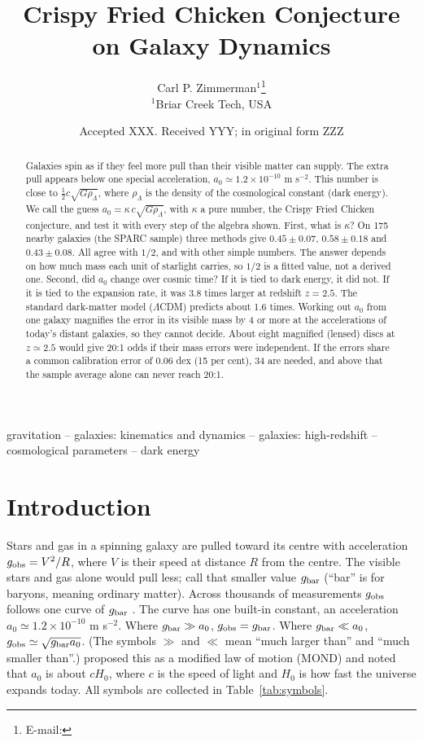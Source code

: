 \documentclass[fleqn,usenatbib]{mnras}
\title[Crispy Fried Chicken Conjecture]{Crispy Fried Chicken Conjecture on Galaxy Dynamics}
\author[C. P. Zimmerman]{Carl P. Zimmerman$^{1}$\thanks{E-mail: \authoremail}
\\
$^{1}$Briar Creek Tech, USA}
\date{Accepted XXX. Received YYY; in original form ZZZ}
\begin{document}
\label{firstpage}
\pagerange{\pageref{firstpage}--\pageref{lastpage}}
\maketitle

\begin{abstract}
Galaxies spin as if they feel more pull than their visible matter can supply. The extra pull appears below one special acceleration, $a_0\simeq1.2\times10^{-10}$ m s$^{-2}$. This number is close to $\tfrac12c\sqrt{G\rho_\Lambda}$, where $\rho_\Lambda$ is the density of the cosmological constant (dark energy). We call the guess $a_0=\kappa\,c\sqrt{G\rho_\Lambda}$, with $\kappa$ a pure number, the Crispy Fried Chicken conjecture, and test it with every step of the algebra shown. First, what is $\kappa$? On 175 nearby galaxies (the SPARC sample) three methods give $0.45\pm0.07$, $0.58\pm0.18$ and $0.43\pm0.08$. All agree with $1/2$, and with other simple numbers. The answer depends on how much mass each unit of starlight carries, so $1/2$ is a fitted value, not a derived one. Second, did $a_0$ change over cosmic time? If it is tied to dark energy, it did not. If it is tied to the expansion rate, it was 3.8 times larger at redshift $z=2.5$. The standard dark-matter model ($\Lambda$CDM) predicts about 1.6 times. Working out $a_0$ from one galaxy magnifies the error in its visible mass by 4 or more at the accelerations of today's distant galaxies, so they cannot decide. About eight magnified (lensed) discs at $z\simeq2.5$ would give 20:1 odds if their mass errors were independent. If the errors share a common calibration error of 0.06 dex (15 per cent), 34 are needed, and above that the sample average alone can never reach 20:1.
\end{abstract}

\begin{keywords}
gravitation -- galaxies: kinematics and dynamics -- galaxies: high-redshift -- cosmological parameters -- dark energy
\end{keywords}

\section{Introduction}
\label{sec:intro}
Stars and gas in a spinning galaxy are pulled toward its centre with acceleration $g_{\rm obs}=V^2/R$, where $V$ is their speed at distance $R$ from the centre. The visible stars and gas alone would pull less; call that smaller value $g_{\rm bar}$ (``bar'' is for baryons, meaning ordinary matter). Across thousands of measurements $g_{\rm obs}$ follows one curve of $g_{\rm bar}$ \citep{McGaugh2016,Lelli2017}. The curve has one built-in constant, an acceleration $a_0\simeq1.2\times10^{-10}$ m s$^{-2}$. Where $g_{\rm bar}\gg a_0$, $g_{\rm obs}=g_{\rm bar}$. Where $g_{\rm bar}\ll a_0$, $g_{\rm obs}\simeq\sqrt{g_{\rm bar}a_0}$. (The symbols $\gg$ and $\ll$ mean ``much larger than'' and ``much smaller than''.) \citet{Milgrom1983} proposed this as a modified law of motion (MOND) and noted that $a_0$ is about $cH_0$, where $c$ is the speed of light and $H_0$ is how fast the universe expands today. All symbols are collected in Table~\ref{tab:symbols}.
\end{document}
